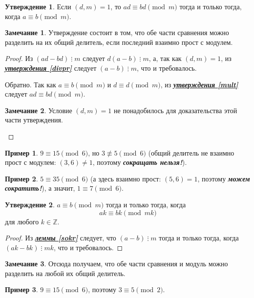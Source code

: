 \documentclass[14pt, a4paper]{extarticle}
\theoremstyle{definition}
\newtheorem*{remark}{Замечание}
\newtheorem{example}{Пример}
\newtheorem{statement}{Утверждение}
\newcommand{\divisible}{\mathop{\vdots}}
\begin{document}
	\begin{statement}
	\label{sokrmod}
		Если $(d,m)=1$, то $ad\equiv bd\pmod{m}$ тогда и только тогда, когда \mbox{$a\equiv b\pmod{m}$}.
	\end{statement}
	\begin{remark}
		Утверждение состоит в том, что обе части сравнения можно разделить на их общий делитель, если последний взаимно прост с модулем.
	\end{remark}
	\begin{proof}
		Из $(ad-bd)\divisible m$ следует $d(a-b)\divisible m$, а, так как $(d,m)=1$, из \hyperref[divpr]{\textbf{\textit{утверждения \ref*{divpr}}}} следует $(a-b)\divisible m$, что и требовалось.
		
		Обратно. Так как $a\equiv b\pmod{m}$ и $d\equiv d\pmod{m}$, из \hyperref[mult]{\textbf{\textit{утверждения \ref*{mult}}}} следует $ad\equiv bd\pmod{m}$.
		\begin{remark}
			Условие $(d,m)=1$ не понадобилось для доказательства этой части утверждения.
		\end{remark}
	\end{proof}

	\begin{example}
		$9\equiv15\pmod{6}$, но $3\not\equiv5\pmod{6}$ (общий делитель не взаимно прост с модулем: $(3,6)\neq1$, поэтому \textbf{\textit{сокращать нельзя!}}).
	\end{example}
	\begin{example}
		$5\equiv35\pmod{6}$ (а здесь взаимно прост: $(5,6)=1$, поэтому \textbf{\textit{можем сократить!}}), а значит, $1\equiv7\pmod{6}$.
	\end{example}

	\begin{statement}
	\label{sokrmod2}
		$a\equiv b\pmod{m}$ тогда и только тогда, когда $$ak\equiv bk\pmod{mk}$$ для любого $k\in\mathbb{Z}$.
	\end{statement}
	\begin{proof}
		Из \hyperref[sokr]{\textbf{\textit{леммы \ref*{sokr}}}} следует, что $(a-b)\divisible m$ тогда и только тогда, когда $(ak-bk)\divisible mk$, что и требовалось.
	\end{proof}

	\begin{remark}
		Отсюда получаем, что обе части сравнения и модуль можно разделить на любой их общий делитель.
	\end{remark}
	
	\begin{example}
		$9\equiv15\pmod{6}$, поэтому $3\equiv5\pmod{2}$.
	\end{example}
\end{document}
